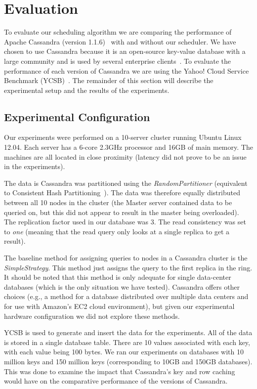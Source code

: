 \section{Evaluation}
\label{sec:experiments}

To evaluate our scheduling algorithm we are comparing the performance of Apache Cassandra (version 1.1.6)~\cite{Lakshman:2010:CDS:1773912.1773922} with and without our scheduler. We have chosen to use Cassandra because it is an open-source key-value database with a large community and is used by several enterprise clients~\cite{DataStaxCassandra}. To evaluate the performance of each version of Cassandra we are using the Yahoo! Cloud Service Benchmark (YCSB)~\cite{Cooper:2010:BCS:1807128.1807152}. The remainder of this section will describe the experimental setup and the results of the experiments.

\subsection{Experimental Configuration}
Our experiments were performed on a 10-server cluster running Ubuntu Linux 12.04. Each server has a 6-core 2.3GHz processor and 16GB of main memory. The machines are all located in close proximity (latency did not prove to be an issue in the experiments).

The data is Cassandra was partitioned using the \textit{RandomPartitioner} (equivalent to Consistent Hash Partitioning~\cite{consistentHashPartitioning}). The data was therefore equally distributed between all 10 nodes in the cluster (the Master server contained data to be queried on, but this did not appear to result in the master being overloaded). The replication factor used in our database was 3. The read consistency was set to \textit{one} (meaning that the read query only looks at a single replica to get a result).

The baseline method for assigning queries to nodes in a Cassandra cluster is the \textit{SimpleStrategy}. This method just assigns the query to the first replica in the ring. It should be noted that this method is only adequate for single data-center databases (which is the only situation we have tested). Cassandra offers other choices (e.g., a method for a database distributed over multiple data centers and for use with Amazon’s EC2 cloud environment), but given our experimental hardware configuration we did not explore these methods.

YCSB is used to generate and insert the data for the experiments. All of the data is stored in a single database table. There are 10 values associated with each key, with each value being 100 bytes. We ran our experiments on databases with 10 million keys and 150 million keys (corresponding to 10GB and 150GB databases). This was done to examine the impact that Cassandra’s key and row caching would have on the comparative performance of the versions of Cassandra.

